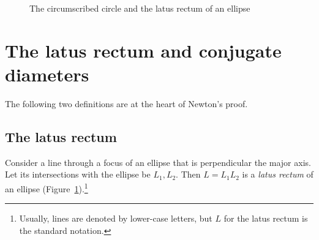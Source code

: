
\begin{figure}[b]
\begin{center}
\caption{The circumscribed circle and the latus rectum of an ellipse}\label{f.ellipse-latus-rectum-def}
\end{center}
\end{figure}



\section{The latus rectum and conjugate diameters}

The following two definitions are at the heart of Newton's proof.

\subsection*{The latus rectum}

\begin{definition}\label{def.ellipse-lr}
Consider a line through a focus of an ellipse that is perpendicular the major axis. Let its intersections with the ellipse be $L_1,L_2$. Then $L=L_1L_2$ is a \emph{latus rectum} of an ellipse (Figure~\ref{f.ellipse-latus-rectum-def}).\footnote{Usually, lines are denoted by lower-case letters, but $L$ for the latus rectum is the standard notation.}
\end{definition}

